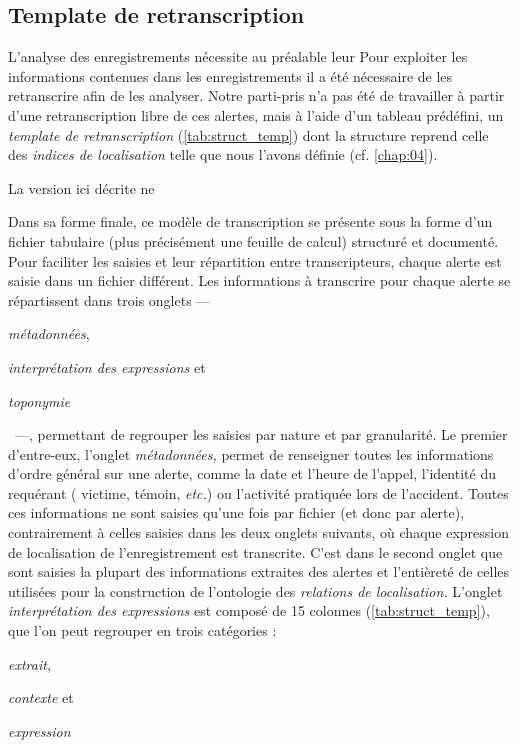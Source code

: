 \subsection{Template de retranscription}

L'analyse des enregistrements nécessite au préalable leur 
Pour exploiter les informations contenues dans les enregistrements il
a été nécessaire de les retranscrire afin de les analyser.
%
Notre parti-pris n'a pas été de travailler à partir d'une
retranscription libre de ces alertes, mais à l'aide d'un tableau
prédéfini, un \emph{template de retranscription}
(\autoref{tab:struct_temp}) dont la structure reprend celle des
\emph{indices de localisation} telle que nous l'avons définie
(cf. \autoref{chap:04}).

La version ici décrite ne 

Dans sa forme finale, ce modèle de transcription se présente sous la
forme d'un fichier tabulaire (plus précisément une feuille de calcul)
structuré et documenté. Pour faciliter les saisies et leur répartition
entre transcripteurs, chaque alerte est saisie dans un fichier
différent.
%
Les informations à transcrire pour chaque alerte se répartissent dans
trois onglets
%
---~\begin{enumerate*}[label=(\alph*)]
\item \emph{métadonnées},
\item \emph{interprétation des expressions} et
\item \emph{toponymie}
\end{enumerate*}~---,
%
permettant de regrouper les saisies par nature et par granularité.
%
Le premier d'entre-eux, l'onglet \emph{métadonnées,} permet de
renseigner toutes les informations d'ordre général sur une alerte,
comme la date et l'heure de l'appel, l'identité du requérant (\eg
victime, témoin, \emph{etc.}) ou l’activité pratiquée lors de
l'accident. Toutes ces informations ne sont saisies qu'une fois par
fichier (et donc par alerte), contrairement à celles saisies dans les
deux onglets suivants, où chaque expression de localisation de
l'enregistrement est transcrite. C'est dans le second onglet que sont
saisies la plupart des informations extraites des alertes et
l’entièreté de celles utilisées pour la construction de l'ontologie
des \emph{relations de localisation.} L'onglet \emph{interprétation
  des expressions} est composé de 15 colonnes
(\autoref{tab:struct_temp}), que l'on peut regrouper en trois
catégories :
%
\begin{enumerate*}[label=(\alph*)]
\item \emph{extrait},
\item \emph{contexte} et
\item \emph{expression}
\end{enumerate*}
